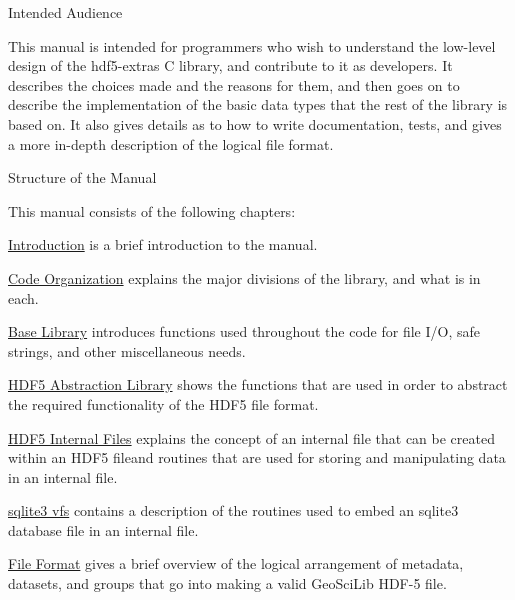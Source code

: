 \begin{DoxyParagraph}{Intended Audience}

\end{DoxyParagraph}
This manual is intended for programmers who wish to understand the low-\/level design of the hdf5-\/extras C library, and contribute to it as developers. It describes the choices made and the reasons for them, and then goes on to describe the implementation of the basic data types that the rest of the library is based on. It also gives details as to how to write documentation, tests, and gives a more in-\/depth description of the logical file format.

\begin{DoxyParagraph}{Structure of the Manual}

\end{DoxyParagraph}
This manual consists of the following chapters\+:

\begin{DoxyItemize}
\item \hyperlink{intro}{Introduction} is a brief introduction to the manual. \item \hyperlink{code_organization}{Code Organization} explains the major divisions of the library, and what is in each. \item \hyperlink{base_library}{Base Library} introduces functions used throughout the code for file I/\+O, safe strings, and other miscellaneous needs. \item \hyperlink{hdf_library}{H\+D\+F5 Abstraction Library} shows the functions that are used in order to abstract the required functionality of the H\+D\+F5 file format. \item \hyperlink{ifile_library}{H\+D\+F5 Internal Files} explains the concept of an internal file that can be created within an H\+D\+F5 fileand routines that are used for storing and manipulating data in an internal file. \item \hyperlink{vfs_library}{sqlite3 vfs} contains a description of the routines used to embed an sqlite3 database file in an internal file. \item \hyperlink{file_format}{File Format} gives a brief overview of the logical arrangement of metadata, datasets, and groups that go into making a valid Geo\+Sci\+Lib H\+D\+F-\/5 file. \end{DoxyItemize}
